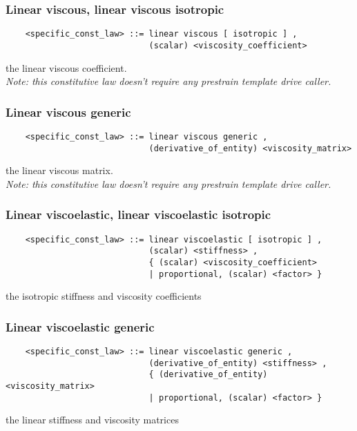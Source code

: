 \subsubsection{Linear viscous, linear viscous isotropic}
\begin{verbatim}
    <specific_const_law> ::= linear viscous [ isotropic ] , 
                             (scalar) <viscosity_coefficient>
\end{verbatim}
the linear viscous coefficient. \\
{\em 
    Note: this constitutive law doesn't require any prestrain template
    drive caller.
}
  
\subsubsection{Linear viscous generic}
\begin{verbatim}
    <specific_const_law> ::= linear viscous generic , 
                             (derivative_of_entity) <viscosity_matrix>
\end{verbatim}
the linear viscous matrix. \\
{\em 
    Note: this constitutive law doesn't require any prestrain template
    drive caller.
}
  
\subsubsection{Linear viscoelastic, linear viscoelastic isotropic}
\begin{verbatim}
    <specific_const_law> ::= linear viscoelastic [ isotropic ] ,
                             (scalar) <stiffness> ,
                             { (scalar) <viscosity_coefficient>
                             | proportional, (scalar) <factor> }
\end{verbatim}
the isotropic stiffness and viscosity coefficients
  
\subsubsection{Linear viscoelastic generic}
\begin{verbatim}
    <specific_const_law> ::= linear viscoelastic generic ,  
                             (derivative_of_entity) <stiffness> ,
                             { (derivative_of_entity) <viscosity_matrix> 
                             | proportional, (scalar) <factor> }
\end{verbatim}
the linear stiffness and viscosity matrices
  
